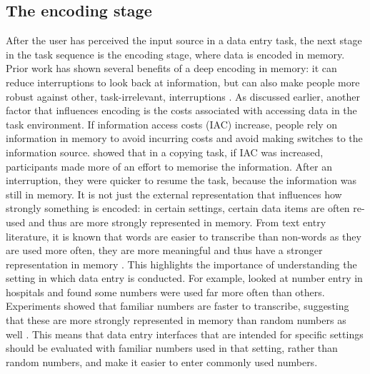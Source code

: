 \subsection{The encoding stage}\label{sec:Encoding_stage}
After the user has perceived the input source in a data entry task, the next stage in the task sequence is the encoding stage, where data is encoded in memory. Prior work has shown several benefits of a deep encoding in memory: it can reduce interruptions to look back at information, but can also make people more robust against other, task-irrelevant, interruptions \citep{Morgan2009}. As discussed earlier, another factor that  influences encoding is the costs associated with accessing data in the task environment. If information access costs (IAC) increase, people rely on information in memory to avoid incurring costs and avoid making switches to the information source. \citet{Morgan2009} showed that in a copying task, if IAC was increased, participants made more of an effort to memorise the information. After an interruption, they were quicker to resume the task, because the information was still in memory. 
\newpage
It is not just the external representation that influences how strongly something is encoded: in certain settings, certain data items are often re-used and thus are more strongly represented in memory. From text entry literature, it is known that words are easier to transcribe than non-words as they are used more often, they are more meaningful and thus have a stronger representation in memory \citep{Salthouse1986}. This highlights the importance of understanding the setting in which data entry is conducted. For example, \citet{Wiseman2013a} looked at number entry in hospitals and found some numbers were used far more often than others. Experiments showed that familiar numbers are faster to transcribe, suggesting that these are more strongly represented in memory than random numbers as well \citep{Wiseman2014}. This means that data entry interfaces that are intended for specific settings should be evaluated with familiar numbers used in that setting, rather than random numbers, and make it easier to enter commonly used numbers. 


